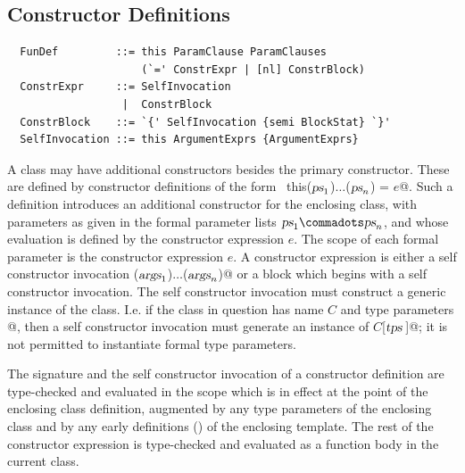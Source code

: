 
\subsection{Constructor Definitions}\label{sec:constr-defs}

\syntax\begin{lstlisting}
  FunDef         ::= this ParamClause ParamClauses 
                     (`=' ConstrExpr | [nl] ConstrBlock)
  ConstrExpr     ::= SelfInvocation
                  |  ConstrBlock
  ConstrBlock    ::= `{' SelfInvocation {semi BlockStat} `}'
  SelfInvocation ::= this ArgumentExprs {ArgumentExprs}
\end{lstlisting}

A class may have additional constructors besides the primary
constructor.  These are defined by constructor definitions of the form
~\lstinline@def this($\mbox{\sl ps}_1$)$\ldots$($\mbox{\sl ps}_n$) = $e$@.  Such a
definition introduces an additional constructor for the enclosing
class, with parameters as given in the formal parameter lists $\ps_1
\commadots \ps_n$, and whose evaluation is defined by the constructor
expression $e$.  The scope of each formal parameter is the constructor
expression $e$.  A constructor expression is either a self constructor
invocation \lstinline@this($\mbox{\sl args}_1$)$\ldots$($\mbox{\sl args}_n$)@ or a block
which begins with a self constructor invocation. The self constructor
invocation must construct a generic instance of the class. I.e. if the
class in question has name $C$ and type parameters
\lstinline@[$\tps\,$]@, then a self constructor invocation must
generate an instance of \lstinline@$C$[$\tps\,$]@; it is not permitted
to instantiate formal type parameters.

The signature and the self constructor invocation of a constructor
definition are type-checked and evaluated in the scope which is in
effect at the point of the enclosing class definition, augmented by
any type parameters of the enclosing class and by any early
definitions () of the enclosing template.
The rest of the
constructor expression is type-checked and evaluated as a function
body in the current class.
  
